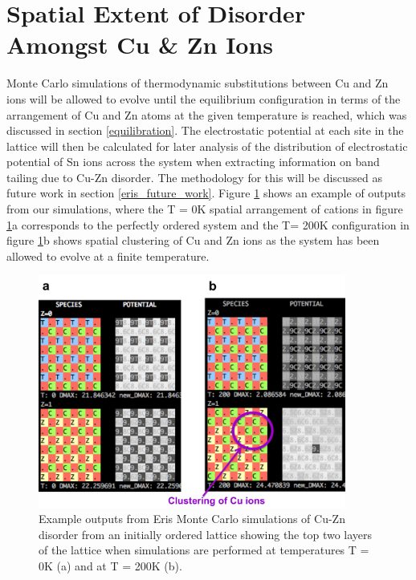 \section{Spatial Extent of Disorder Amongst Cu \& Zn Ions}
Monte Carlo simulations of thermodynamic substitutions between Cu and Zn ions  will be allowed to evolve until the equilibrium configuration in terms of the arrangement of Cu and Zn atoms at the given temperature is reached, which was discussed in section \ref{equilibration}. The electrostatic potential at each site in the lattice will then be calculated for later analysis of the distribution of electrostatic potential of Sn ions across the system when extracting information on band tailing due to Cu-Zn disorder. The methodology for this will be discussed as future work in section \ref{eris_future_work}. Figure \ref{eris_spatial_disorder} shows an example of outputs from our simulations, where the T = 0K spatial arrangement of cations in figure \ref{eris_spatial_disorder}a corresponds to the perfectly ordered system and the T= 200K configuration in figure \ref{eris_spatial_disorder}b shows spatial clustering of Cu and Zn ions as the system has been allowed to evolve at a finite temperature.

\begin{figure}[h!]
  \centering
    \includegraphics[width=0.9\textwidth]{figures/eris_spatial_disorder.png}
    \caption{Example outputs from Eris Monte Carlo simulations of Cu-Zn disorder from an initially ordered lattice showing the top two layers of the lattice when simulations are performed at temperatures T = 0K (a) and at T = 200K (b).}
  \label{eris_spatial_disorder}
\end{figure}

